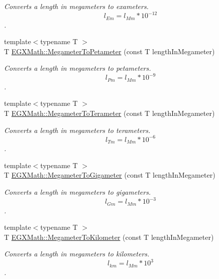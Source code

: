 \begin{DoxyCompactItemize}
\begin{DoxyCompactList}\small\item\em Converts a length in megameters to exameters. \[ l_{Em}=l_{Mm} * 10^{-12} \]. \end{DoxyCompactList}\item 
{\footnotesize template$<$typename T $>$ }\\T \mbox{\hyperlink{group___e_g_x_math-_conversions-_length_conversions-_megameter-_s_i_gad40646b8456e092061f26bc6c6c65925}{E\+G\+X\+Math\+::\+Megameter\+To\+Petameter}} (const T length\+In\+Megameter)
\begin{DoxyCompactList}\small\item\em Converts a length in megameters to petameters. \[ l_{Pm}=l_{Mm} * 10^{-9} \]. \end{DoxyCompactList}\item 
{\footnotesize template$<$typename T $>$ }\\T \mbox{\hyperlink{group___e_g_x_math-_conversions-_length_conversions-_megameter-_s_i_ga381dd9fb7b3a0867e03bde8de98ee82e}{E\+G\+X\+Math\+::\+Megameter\+To\+Terameter}} (const T length\+In\+Megameter)
\begin{DoxyCompactList}\small\item\em Converts a length in megameters to terameters. \[ l_{Tm}=l_{Mm} * 10^{-6} \]. \end{DoxyCompactList}\item 
{\footnotesize template$<$typename T $>$ }\\T \mbox{\hyperlink{group___e_g_x_math-_conversions-_length_conversions-_megameter-_s_i_gaa59e3194a054aeb6623886f72e245103}{E\+G\+X\+Math\+::\+Megameter\+To\+Gigameter}} (const T length\+In\+Megameter)
\begin{DoxyCompactList}\small\item\em Converts a length in megameters to gigameters. \[ l_{Gm}=l_{Mm} * 10^{-3} \]. \end{DoxyCompactList}\item 
{\footnotesize template$<$typename T $>$ }\\T \mbox{\hyperlink{group___e_g_x_math-_conversions-_length_conversions-_megameter-_s_i_gac428a2600cebd4a837801bef72380560}{E\+G\+X\+Math\+::\+Megameter\+To\+Kilometer}} (const T length\+In\+Megameter)
\begin{DoxyCompactList}\small\item\em Converts a length in megameters to kilometers. \[ l_{km}=l_{Mm} * 10^{3} \]. \end{DoxyCompactList}\item 

\end{DoxyCompactItemize}
